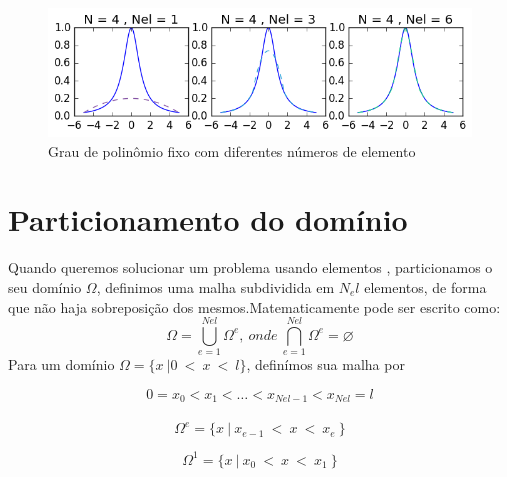 \begin{figure}[!b]
\includegraphics[width=0.6 \textwidth, center]{figuras/compara_metodo_n2.png}
\caption{Grau de polinômio fixo com diferentes números de elemento}
\end{figure}

\pagebreak
\section{Particionamento do domínio}
 Quando queremos solucionar um problema usando elementos , particionamos o seu domínio $\Omega$, definimos uma malha subdividida em $N_el$ elementos, de forma que não haja sobreposição dos mesmos.Matematicamente pode ser escrito como:\
\begin{equation}
 \Omega  = \bigcup^{Nel}_{e= 1} \Omega^e,\ onde\ \bigcap^{Nel}_{e= 1} \Omega^e = \varnothing
\end{equation}
Para um domínio $ \Omega = \{x\ | 0 \ <\ x\ <\ l  \}$, definímos sua malha por 

\begin{equation}
 0  = x_0 < x_1 < \ldots < x_{Nel - 1} < x_{Nel} = l
\end{equation}
\
\begin{equation}
 \Omega^e = \{x\ |\ x_{e-1}\ <\ x\ <\ x_{e}\ \}
\end{equation}



\begin{equation}
 \Omega^1 = \{x\ |\ x_{0}\ <\ x\ <\ x_{1}\ \}
\end{equation}






